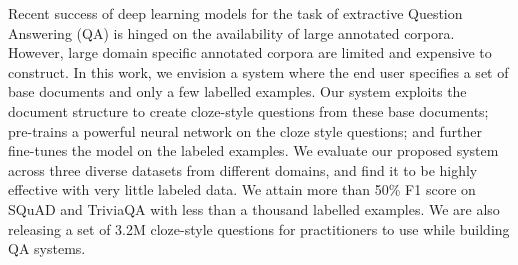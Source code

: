 Recent success of deep learning models for the task of extractive Question Answering (QA) is hinged on the availability of large annotated corpora. However, large domain specific annotated corpora are limited and expensive to construct. In this work, we envision a system where the end user specifies a set of base documents and only a few labelled examples. Our system exploits the document structure to create cloze-style questions from these base documents; pre-trains a powerful neural network on the cloze style questions; and further fine-tunes the model on the labeled examples. We evaluate our proposed system across three diverse datasets from different domains, and find it to be highly effective with very little labeled data. We attain more than 50\% F1 score on SQuAD and TriviaQA with less than a thousand labelled examples. We are also releasing a set of 3.2M cloze-style questions for practitioners to use while building QA systems.
